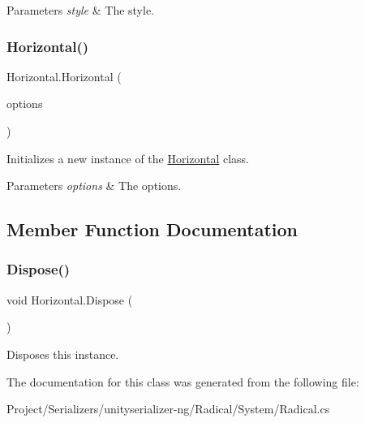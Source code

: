 \begin{DoxyParams}{Parameters}
{\em style} & The style.\\
\hline
\end{DoxyParams}
\mbox{\label{class_horizontal_a6a9031bf0678fd40e1f1ea831c6cad0c}} 
\subsubsection{\texorpdfstring{Horizontal()}{Horizontal()}\hspace{0.1cm}{\footnotesize\ttfamily [3/3]}}
{\footnotesize\ttfamily Horizontal.\+Horizontal (\begin{DoxyParamCaption}\item[{params G\+U\+I\+Layout\+Option \mbox{[}$\,$\mbox{]}}]{options }\end{DoxyParamCaption})\hspace{0.3cm}{\ttfamily [inline]}}



Initializes a new instance of the \hyperlink{class_horizontal}{Horizontal} class. 


\begin{DoxyParams}{Parameters}
{\em options} & The options.\\
\hline
\end{DoxyParams}


\subsection{Member Function Documentation}
\mbox{\label{class_horizontal_a04962fe36ec16ab09988b50828c9fe16}} 
\subsubsection{\texorpdfstring{Dispose()}{Dispose()}}
{\footnotesize\ttfamily void Horizontal.\+Dispose (\begin{DoxyParamCaption}{ }\end{DoxyParamCaption})\hspace{0.3cm}{\ttfamily [inline]}}



Disposes this instance. 



The documentation for this class was generated from the following file\+:\begin{DoxyCompactItemize}
\item 
Project/\+Serializers/unityserializer-\/ng/\+Radical/\+System/Radical.\+cs\end{DoxyCompactItemize}
